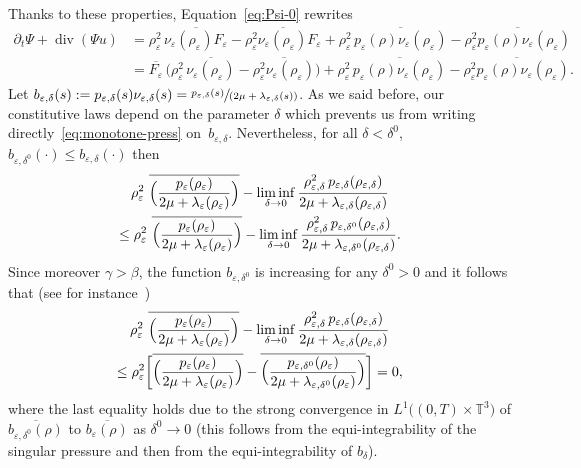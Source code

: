 \documentclass[JEP,XML,SOM,Unicode,NoEqCountersInSection]{cedram}
\newcommand{\<}{\bigl\langle}
\renewcommand{\>}{\bigr\rangle}
\newcommand{\spfrac}[2]{\sfrac{#1}{(#2)}}
\newcommand{\labeleq}[1]{}
\theoremstyle{definition}
\theoremstyle{remark}
\newcommand{\TT}{\mathbb{T}^3}
\DeclareMathOperator{\Div}{div}
\let\ov\overline
\let\ep\varepsilon
\begin{document}
Thanks to these properties, Equation~\eqref{eq:Psi-0} rewrites
\begin{align*}\labeleq{Psi}
\partial_t \Psi + \Div(\Psi u)
& = \rho_\ep^2\, \ov{\nu_\ep (\rho_\ep) F_\ep } - \ov{\rho_\ep^2 \nu_\ep (\rho_\ep) F_\ep } + \rho_\ep^2\, \ov{ p_\ep(\rho) \nu_\ep(\rho_\ep) } - \ov{ \rho_\ep^2 p_\ep(\rho) \nu_\ep(\rho_\ep) } \\
& = \ov{ F_\ep } \, \bigl(\rho_\ep^2 \,\ov{\nu_\ep(\rho_\ep)} - \ov{\rho_\ep^2 \nu_\ep(\rho_\ep)} \bigr) + \rho_\ep^2\, \ov{ p_\ep(\rho) \nu_\ep(\rho_\ep) } - \ov{ \rho_\ep^2 p_\ep(\rho) \nu_\ep(\rho_\ep) }.
\end{align*}
Let $b_{\ep,\delta}(s) := p_{\ep,\delta}(s) \nu_{\ep,\delta}(s) = \spfrac{p_{\ep,\delta}(s)}{2\mu +\lambda_{\ep,\delta}(s)}$.
As we said before, our constitutive laws depend on the parameter $\delta$ which prevents us from writing directly~\eqref{eq:monotone-press} on~$b_{\ep,\delta}$.
Nevertheless, for all $\delta < \delta^0$, $b_{\ep,\delta^0}(\cdot) \leq b_{\ep,\delta}(\cdot)$ then
\begin{multline*}
\rho_\ep^2 \ \ov{\Bigl(\dfrac{p_\ep(\rho_\ep)}{2\mu +\lambda_\ep(\rho_\ep)} \Bigr)} - \liminf_{\delta \rightarrow 0} \dfrac{\rho_{\ep,\delta}^2\, p_{\ep,\delta}(\rho_{\ep,\delta})}{2\mu +\lambda_{\ep,\delta}(\rho_{\ep,\delta})}\\
\leq \rho_\ep^2 \ \ov{\Bigl(\dfrac{p_\ep(\rho_\ep)}{2\mu +\lambda_\ep(\rho_\ep)} \Bigr)} - \liminf_{\delta \rightarrow 0} \dfrac{\rho_{\ep,\delta}^2\, p_{\ep,\delta^0}(\rho_{\ep,\delta})}{2\mu +\lambda_{\ep,\delta^0}(\rho_{\ep,\delta})}.
\end{multline*}
Since moreover $\gamma > \beta$, the function $b_{\ep,\delta^0}$ is increasing for any $\delta^0 > 0$ and it follows that (see for instance~\cite[Lem.\,3.35]{novotny2004})
\begin{multline*}
\rho_\ep^2 \ \ov{\Bigl(\dfrac{p_\ep(\rho_\ep)}{2\mu +\lambda_\ep(\rho_\ep)} \Bigr)} - \liminf_{\delta \rightarrow 0} \dfrac{\rho_{\ep,\delta}^2\, p_{\ep,\delta}(\rho_{\ep,\delta})}{2\mu +\lambda_{\ep,\delta}(\rho_{\ep,\delta})}\\
\leq \rho_\ep^2 \biggl[ \ov{\Bigl(\dfrac{p_\ep(\rho_\ep)}{2\mu +\lambda_\ep(\rho_\ep)} \Bigr)} - \ov{\Bigl(\dfrac{ p_{\ep,\delta^0}(\rho_{\ep})}{2\mu +\lambda_{\ep,\delta^0}(\rho_{\ep})}\Bigr)}\biggr] = 0,
\end{multline*}
where the last equality holds due to the strong convergence in $L^1\big((0,T)\times \TT\big)$ of $\ov{b_{\ep,\delta^0}(\rho)}$ to $\ov{b_{\ep}(\rho)}$ as $\delta^0 \rightarrow 0$ (this follows from the equi-integrability of the singular pressure and then from the equi-integrability of $b_\delta$).
\end{document}
